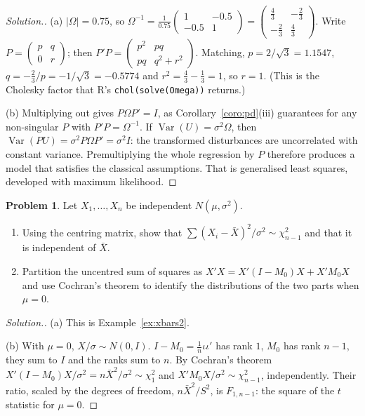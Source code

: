 \documentclass[11pt,a4paper]{article}
\numberwithin{equation}{section}
\DeclareMathOperator{\Var}{Var}
\theoremstyle{definition}
\newtheorem{problemx}{Problem}[subsection]
\newenvironment{problem}{\begin{problemx}}{\end{problemx}}
\newenvironment{solution}
  {\renewcommand{\qedsymbol}{}\begin{proof}[\textit{Solution}.]}
  {\end{proof}}
\begin{document}
\begin{solution}
(a) $|\Omega| = 0.75$, so $\Omega^{-1} = \frac{1}{0.75}\begin{pmatrix} 1 & -0.5 \\ -0.5 & 1 \end{pmatrix} = \begin{pmatrix} \frac43 & -\frac23 \\ -\frac23 & \frac43 \end{pmatrix}$. Write
$P = \begin{pmatrix} p & q \\ 0 & r \end{pmatrix}$; then
$P'P = \begin{pmatrix} p^2 & pq \\ pq & q^2 + r^2 \end{pmatrix}$. Matching, $p = 2/\sqrt3 = 1.1547$, $q = -\frac23/p = -1/\sqrt3 = -0.5774$ and
$r^2 = \frac43 - \frac13 = 1$, so $r = 1$. (This is the Cholesky factor that R's \texttt{chol(solve(Omega))} returns.)

(b) Multiplying out gives $P\Omega P' = I$, as Corollary~\ref{coro:pd}(iii) guarantees for any non-singular $P$ with $P'P = \Omega^{-1}$. If $\Var(U) = \sigma^2\Omega$,
then $\Var(PU) = \sigma^2P\Omega P' = \sigma^2I$: the transformed disturbances are uncorrelated with constant variance. Premultiplying the whole regression
by $P$ therefore produces a model that satisfies the classical assumptions. That is generalised least squares, developed with maximum likelihood.
\end{solution}

\begin{problem}
Let $X_1, \dots, X_n$ be independent $N(\mu, \sigma^2)$.
\begin{enumerate}[label=(\alph*)]
\item Using the centring matrix, show that $\sum (X_i - \bar X)^2/\sigma^2 \sim \chi^2_{n-1}$ and that it is independent of $\bar X$.
\item Partition the uncentred sum of squares as $X'X = X'(I - M_0)X + X'M_0X$ and use Cochran's theorem to identify the distributions of the two parts
when $\mu = 0$.
\end{enumerate}
\end{problem}

\begin{solution}
(a) This is Example~\ref{ex:xbars2}.

(b) With $\mu = 0$, $X/\sigma \sim N(0, I)$. $I - M_0 = \frac1n\iota\iota'$ has rank $1$, $M_0$ has rank $n - 1$, they sum to $I$ and the ranks sum to $n$. By Cochran's
theorem $X'(I - M_0)X/\sigma^2 = n\bar X^2/\sigma^2 \sim \chi^2_1$ and $X'M_0X/\sigma^2 \sim \chi^2_{n-1}$, independently. Their ratio, scaled by the degrees of freedom,
$n\bar X^2/S^2$, is $F_{1,n-1}$: the square of the $t$ statistic for $\mu = 0$.
\end{solution}
\end{document}
